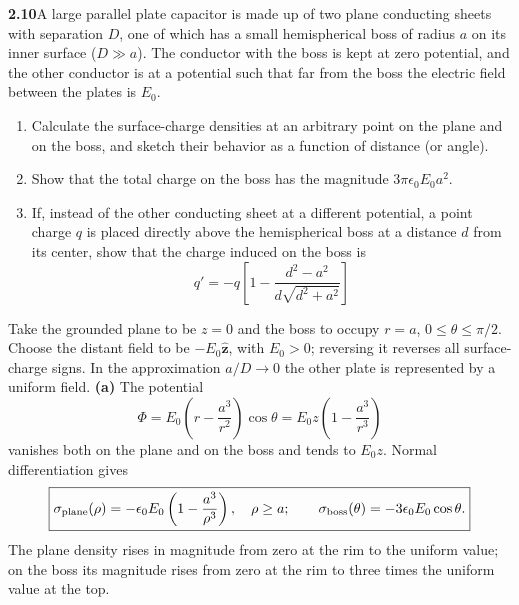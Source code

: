 \par\bigskip
\noindent\textbf{2.10}\quad A large parallel plate capacitor is made up of two plane conducting sheets with separation $D$, one of which has a small hemispherical boss of radius $a$ on its inner surface ($D\gg a$). The conductor with the boss is kept at zero potential, and the other conductor is at a potential such that far from the boss the electric field between the plates is $E_{0}$.
\begin{enumerate}
\item[(a)] Calculate the surface-charge densities at an arbitrary point on the plane and on the boss, and sketch their behavior as a function of distance (or angle).
\item[(b)] Show that the total charge on the boss has the magnitude $3\pi\epsilon_{0}E_{0}a^{2}$.
\item[(c)] If, instead of the other conducting sheet at a different potential, a point charge $q$ is placed directly above the hemispherical boss at a distance $d$ from its center, show that the charge induced on the boss is
\[
q'=-q\left[1-\frac{d^{2}-a^{2}}{d\sqrt{d^{2}+a^{2}}}\right]
\]
\end{enumerate}
\solution
Take the grounded plane to be $z=0$ and the boss to occupy $r=a$,
$0\leq\theta\leq\pi/2$. Choose the distant field to be
$-E_0\widehat{\mathbf z}$, with $E_0>0$; reversing it reverses all
surface-charge signs. In the approximation $a/D\to0$ the other
plate is represented by a uniform field.
\textbf{(a)} The potential
\[
\Phi=E_0\left(r-\frac{a^3}{r^2}\right)\cos\theta
      =E_0z\left(1-\frac{a^3}{r^3}\right)
\]
vanishes both on the plane and on the boss and tends to $E_0z$.
Normal differentiation gives
\[
\boxed{\sigma_{\rm plane}(\rho)
=-\epsilon _0E_0\left(1-\frac{a^3}{\rho^3}\right),\quad\rho\geq a;
\qquad \sigma_{\rm boss}(\theta)=-3\epsilon _0E_0\cos\theta.}
\]
The plane density rises in magnitude from zero at the rim to the
uniform value; on the boss its magnitude rises from zero at the rim
to three times the uniform value at the top.
\begin{center}
\end{center}
